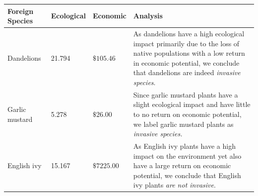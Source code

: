 \begin{table}[h]
\renewcommand{\arraystretch}{1.3}
    \begin{tabularx}{\textwidth}{p{}llX}
    \toprule
    \textbf{Foreign Species}  & \textbf{Ecological} & \textbf{Economic} & \textbf{Analysis} \\ \midrule
    \raggedright Dandelions & 21.794 & \(\$105.46\) & As dandelions have a high ecological impact primarily due to the loss of native populations with a low return in economic potential, we conclude that dandelions are indeed \textit{invasive species}. \\
    \rowcolor{gray!15}
    \raggedright Garlic mustard & 5.278  & \(\$26.00\) & Since garlic mustard plants have a slight ecological impact and have little to no return on economic potential, we label garlic mustard plants as \textit{invasive species.}\\
    \raggedright English ivy & 15.167 & \(\$7225.00\) & As English ivy plants have a high impact on the environment yet also have a large return on economic potential, we conclude that English ivy plants \textit{are not invasive}.\\
    \bottomrule
    \end{tabularx}
\end{table}